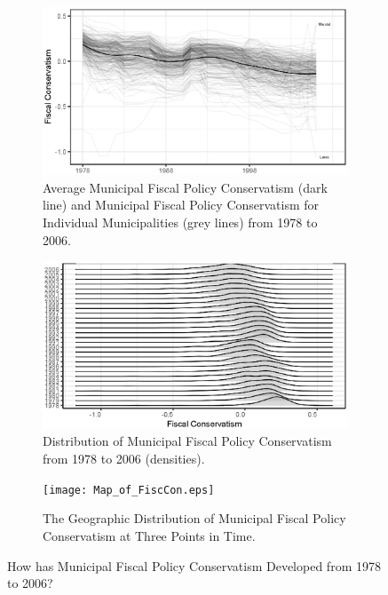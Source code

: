 \documentclass[a4paper,12pt]{article}
\begin{document}
	
\begin{figure}
\centering 
	\begin{subfigure}[h]{0.38\textwidth} 
	\includegraphics[width=1\textwidth]{newtimes_lines.eps}
	\caption{Average Municipal Fiscal Policy Conservatism (dark line) and Municipal Fiscal Policy Conservatism for Individual Municipalities (grey lines) from 1978 to 2006.}
	\label{fig:timeline}
			\end{subfigure} \hspace{1cm}
		\begin{subfigure}{0.38\textwidth} 
	\includegraphics[width=1\textwidth]{newJoyPlotFiscal.eps}
	\caption{Distribution of Municipal Fiscal Policy Conservatism from 1978 to 2006 (densities).}
	\label{fig:lines}
	\end{subfigure}
		\begin{subfigure}{0.9\textwidth} 
	\texttt{[image: Map\_of\_FiscCon.eps]}
	\caption{The Geographic Distribution of Municipal Fiscal Policy Conservatism at Three Points in Time.}
	\label{fig:map}
		\end{subfigure} 
	
	\caption{How has Municipal Fiscal Policy Conservatism Developed from 1978 to 2006?}
	\label{fig:descriptive}
	
\end{figure}
\end{document}
